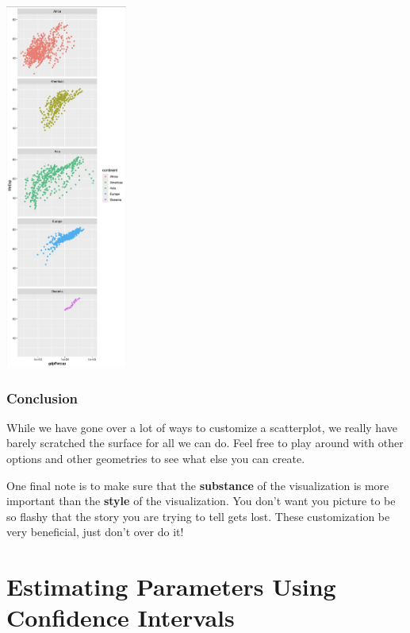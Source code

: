 \documentclass[
  letterpaper,
  DIV=11,
  numbers=noendperiod]{scrreprt}
\begin{document}
\includegraphics[width=0.3\textwidth,height=\textheight]{./images/AST_5.jpg}

\subsection*{Conclusion}\label{conclusion-3}

While we have gone over a lot of ways to customize a scatterplot, we
really have barely scratched the surface for all we can do. Feel free to
play around with other options and other geometries to see what else you
can create.

One final note is to make sure that the \textbf{substance} of the
visualization is more important than the \textbf{style} of the
visualization. You don't want you picture to be so flashy that the story
you are trying to tell gets lost. These customization be very
beneficial, just don't over do it!


\chapter*{Estimating Parameters Using Confidence
Intervals}\label{estimating-parameters-using-confidence-intervals}

\end{document}
